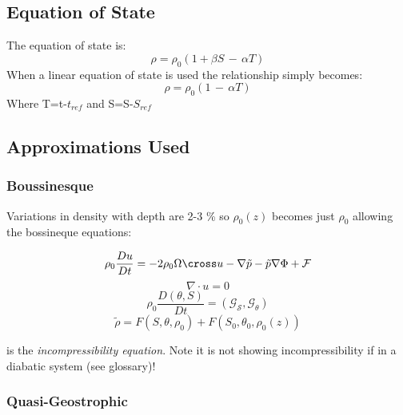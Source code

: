 \subsection{Equation of State}
The equation of state is:
\begin{equation}
\rho = \rho_{0}(1+\beta S\,-\,\alpha T)
\label{}
\end{equation}
When a linear equation of state is used the relationship simply becomes: 
\begin{equation}
\rho = \rho_{0}(1\,-\,\alpha T)
\label{}
\end{equation}
Where T=t-$t_{ref}$ and S=S-$S_{ref}$

\subsection{Approximations Used}

\subsubsection{Boussinesque}

Variations in density with depth are 2-3 \%  so $ \rho _0 (z)$ becomes just $ \rho _0$ allowing the bossineque equations:

\begin{equation}
\rho _0 \frac{Du}{Dt} = -2 \rho _0 \Omega \cross u - \nabla \tilde{p} - \tilde{p} \nabla \Phi + \mathcal{F}
\label{eq:BQ1}
\end{equation}
\begin{equation}
\nabla \cdot u = 0
\label{eq:BQ2}
\end{equation}
\begin{equation}
\rho _0 \frac{D (\theta, S)}{Dt} = ( \mathcal{G_S}, \mathcal{G_{\theta}})
\label{eq:BQ3}
\end{equation}
\begin{equation}
\tilde{\rho} = F ( S, \theta, \rho _0 ) + F(S_0, \theta _0, \rho _0 (z))
\label{eq:BQ4}
\end{equation}

 is the \textit{\gls{incompressibility} equation}. Note it is not showing \gls{incompressibility} if in a diabatic system (see glossary)!

\subsubsection{Quasi-Geostrophic}

